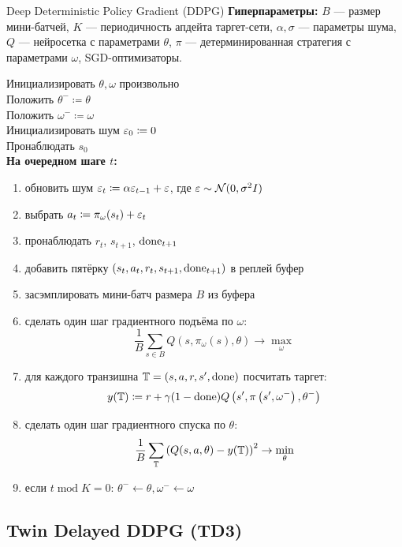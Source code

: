 \begin{algorithm}[label = DDPGalgorithm]{Deep Deterministic Policy Gradient (DDPG)}
\textbf{Гиперпараметры:} $B$ --- размер мини-батчей, $K$ --- периодичность апдейта таргет-сети, $\alpha, \sigma$ --- параметры шума, $Q$ --- нейросетка с параметрами $\theta$, $\pi$ --- детерминированная стратегия с параметрами $\omega$, SGD-оптимизаторы.

\vspace{0.3cm}
Инициализировать $\theta, \omega$ произвольно \\
Положить $\theta^- \coloneqq \theta$ \\
Положить $\omega^- \coloneqq \omega$ \\
Инициализировать шум $\varepsilon_0 \coloneqq 0$ \\
Пронаблюдать $s_0$ \\
\textbf{На очередном шаге $t$:}
\begin{enumerate}
    \item обновить шум $\varepsilon_{t} \coloneqq \alpha \varepsilon_{t-1} + \varepsilon$, где $\varepsilon \sim \mathcal{N}(0, \sigma^2 I)$
    \item выбрать $a_t \coloneqq \pi_\omega(s_t) + \varepsilon_{t}$
    \item пронаблюдать $r_t$,  $s_{t+1}$, $\mathrm{done}_{t+1}$
    \item добавить пятёрку $(s_t, a_t, r_t, s_{t+1}, \mathrm{done}_{t+1})$ в реплей буфер
    \item засэмплировать мини-батч размера $B$ из буфера
    \item сделать один шаг градиентного подъёма по $\omega$:
    $$\frac{1}{B}\sum_{s \in B} Q(s, \pi_\omega(s), \theta) \to \max_{\omega}$$
    \item для каждого транзишна $\mathbb{T} = (s, a, r, s', \mathrm{done})$ посчитать таргет:
    $$y(\mathbb{T} ) \coloneqq r + \gamma (1 - \mathrm{done}) Q\left( s', \pi \left( s', \omega^{-}\right), \theta^{-} \right)$$
    \item сделать один шаг градиентного спуска по $\theta$:
    $$\frac{1}{B}\sum_{\mathbb{T}} \left( Q(s, a, \theta) - y(\mathbb{T} ) \right) ^2 \to \min_\theta$$
    \item если $t \operatorname{mod} K = 0$: $\theta^- \gets \theta, \omega^- \gets \omega$
\end{enumerate}
\end{algorithm}

\subsection{Twin Delayed DDPG (TD3)}


